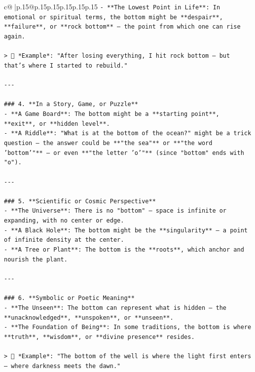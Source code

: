 \documentclass{article}
\begin{document}
{\begin{supertabular}{c@{$\;$}|p{.15\linewidth}@{}p{.15\linewidth}p{.15\linewidth}p{.15\linewidth}p{.15\linewidth}p{.15\linewidth}}
{{{\texttt{{-} **The Lowest Point in Life**: In emotional or spiritual terms, the bottom might be **despair**, **failure**, or **rock bottom** — the point from which one can rise again.} \\
\\ 
\texttt{> 🌱 *Example*: "After losing everything, I hit rock bottom — but that’s where I started to rebuild."} \\
\\ 
\texttt{{-}{-}{-}} \\
\\ 
\texttt{\#\#\# 4. **In a Story, Game, or Puzzle**} \\
\texttt{{-} **A Game Board**: The bottom might be a **starting point**, **exit**, or **hidden level**.} \\
\texttt{{-} **A Riddle**: "What is at the bottom of the ocean?" might be a trick question — the answer could be **"the sea"** or **"the word 'bottom'"** — or even **"the letter 'o'"** (since "bottom" ends with "o").} \\
\\ 
\texttt{{-}{-}{-}} \\
\\ 
\texttt{\#\#\# 5. **Scientific or Cosmic Perspective**} \\
\texttt{{-} **The Universe**: There is no "bottom" — space is infinite or expanding, with no center or edge.} \\
\texttt{{-} **A Black Hole**: The bottom might be the **singularity** — a point of infinite density at the center.} \\
\texttt{{-} **A Tree or Plant**: The bottom is the **roots**, which anchor and nourish the plant.} \\
\\ 
\texttt{{-}{-}{-}} \\
\\ 
\texttt{\#\#\# 6. **Symbolic or Poetic Meaning**} \\
\texttt{{-} **The Unseen**: The bottom can represent what is hidden — the **unacknowledged**, **unspoken**, or **unseen**.} \\
\texttt{{-} **The Foundation of Being**: In some traditions, the bottom is where **truth**, **wisdom**, or **divine presence** resides.} \\
\\ 
\texttt{> 🌿 *Example*: "The bottom of the well is where the light first enters — where darkness meets the dawn."} \\
\\ 
}}}
\end{supertabular}}
\end{document}
